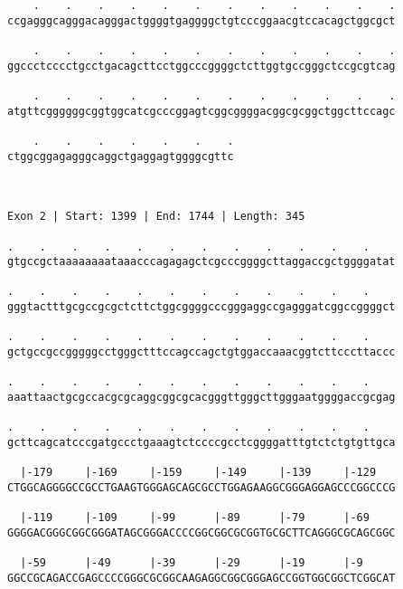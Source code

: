 \documentclass{article}
\begin{document}
\begin{Verbatim}
    .    .    .    .    .    .    .    .    .    .    .    .
ccgagggcagggacagggactggggtgaggggctgtcccggaacgtccacagctggcgct
                                                            
    .    .    .    .    .    .    .    .    .    .    .    .
ggccctcccctgcctgacagcttcctggcccggggctcttggtgccgggctccgcgtcag
                                                            
    .    .    .    .    .    .    .    .    .    .    .    .
atgttcggggggcggtggcatcgcccggagtcggcggggacggcgcggctggcttccagc
                                                            
    .    .    .    .    .    .    .
ctggcggagagggcaggctgaggagtggggcgttc
                                   
                                   
 
Exon 2 | Start: 1399 | End: 1744 | Length: 345
 
.    .    .    .    .    .    .    .    .    .    .    .    
gtgccgctaaaaaaaataaacccagagagctcgcccggggcttaggaccgctggggatat
                                                            
.    .    .    .    .    .    .    .    .    .    .    .    
gggtactttgcgccgcgctcttctggcggggcccgggaggccgagggatcggccggggct
                                                            
.    .    .    .    .    .    .    .    .    .    .    .    
gctgccgccgggggcctgggctttccagccagctgtggaccaaacggtcttcccttaccc
                                                            
.    .    .    .    .    .    .    .    .    .    .    .    
aaattaactgcgccacgcgcaggcggcgcacgggttgggcttgggaatggggaccgcgag
                                                            
.    .    .    .    .    .    .    .    .    .    .    .    
gcttcagcatcccgatgccctgaaagtctccccgcctcggggatttgtctctgtgttgca
                                                            
  |-179     |-169     |-159     |-149     |-139     |-129   
CTGGCAGGGGCCGCCTGAAGTGGGAGCAGCGCCTGGAGAAGGCGGGAGGAGCCCGGCCCG
                                                            
  |-119     |-109     |-99      |-89      |-79      |-69    
GGGGACGGGCGGCGGGATAGCGGGACCCCGGCGGCGCGGTGCGCTTCAGGGCGCAGCGGC
                                                            
  |-59      |-49      |-39      |-29      |-19      |-9     
GGCCGCAGACCGAGCCCCGGGCGCGGCAAGAGGCGGCGGGAGCCGGTGGCGGCTCGGCAT
                                                            

\end{Verbatim}
\end{document}
